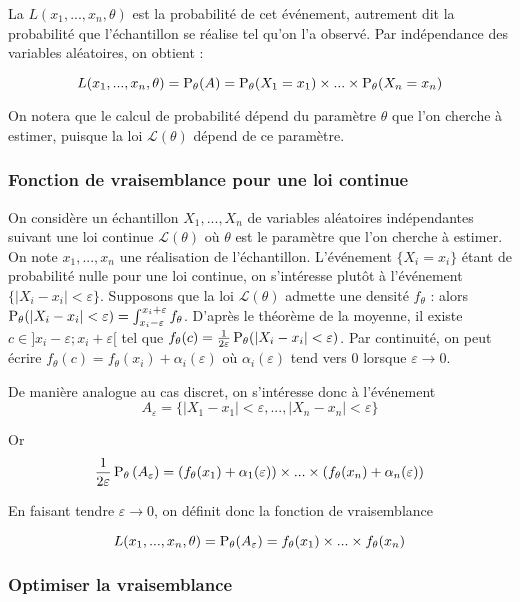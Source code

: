 La  $L(x_1,...,x_n, \theta)$ est la probabilité de cet événement, autrement dit la probabilité que l'échantillon se réalise tel qu'on l'a observé. Par indépendance des variables aléatoires, on obtient :

$$L(x_1,...,x_n, \theta) = \operatorname{P}_\theta(A) = \operatorname{P}_\theta(X_1=x_1) \times ... \times \operatorname{P}_\theta(X_n=x_n)$$

On notera que le calcul de probabilité dépend du paramètre $\theta$ que l'on cherche à estimer, puisque la loi $\mathcal{L}(\theta)$ dépend de ce paramètre.

\subsubsection{Fonction de vraisemblance pour une loi continue}

On considère un échantillon $X_1,...,X_n$ de variables aléatoires indépendantes suivant une loi continue $\mathcal{L}(\theta)$ où $\theta$ est le paramètre que l'on cherche à estimer. On note $x_1,...,x_n$ une réalisation de l'échantillon. L'événement $\{X_i=x_i\}$ étant de probabilité nulle pour une loi continue, on s'intéresse plutôt à l'événement $\{|X_i-x_i|<\varepsilon\}$. Supposons que la loi $\mathcal{L}(\theta)$ admette une densité $f_{\theta}$ : alors $\operatorname{P}_{\theta}(|X_i-x_i|<\varepsilon) = \int_{x_i-\varepsilon}^{x_i+\varepsilon} f_{\theta}$. D'après le théorème de la moyenne, il existe $c \in ]x_i-\varepsilon;x_i+\varepsilon[$ tel que $f_{\theta}(c) = \frac{1}{2\varepsilon} \operatorname{P}_{\theta}(|X_i-x_i|<\varepsilon)$. Par continuité, on peut écrire $f_{\theta}(c) = f_{\theta}(x_i)+\alpha_i(\varepsilon)$ où $\alpha_i(\varepsilon)$ tend vers $0$ lorsque $\varepsilon \to 0$. 

De manière analogue au cas discret, on s'intéresse donc à l'événement 
$$A_{\varepsilon} = \{|X_1-x_1|<\varepsilon,...,|X_n-x_n|<\varepsilon\}$$

Or $$ \frac{1}{2\varepsilon} \operatorname{P}_{\theta}\left(A_{\varepsilon}\right) = \left(f_{\theta}(x_1)+\alpha_1(\varepsilon)\right) \times ... \times \left(f_{\theta}(x_n)+\alpha_n(\varepsilon)\right)$$

En faisant tendre $\varepsilon \to 0$, on définit donc la fonction de vraisemblance 

$$L(x_1,...,x_n, \theta) = \operatorname{P}_\theta(A_{\varepsilon}) = f_{\theta}(x_1) \times ... \times f_{\theta}(x_n)$$

\subsubsection{Optimiser la vraisemblance}

